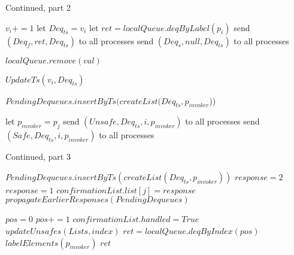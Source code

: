 \documentclass[a4paper,USenglish]{lipics-v2021} %
\begin{document}
\begin{algorithm}
  \caption{Continued, part 2}
  \begin{algorithmic}[1]
      \State $v_i += 1$
      \State let $Deq_{ts} = v_i$
       
        \State let $ret = localQueue.deqByLabel(p_i)$
        \State send $(Deq_f, ret, Deq_{ts})$ to all processes
      \Else
        \State send $(Deq_s, null, Deq_{ts})$ to all processes
      \EndIf
    \EndFunction

       $localQueue.remove(val)$ \EndIf
    \EndFunction

      \State $UpdateTs(v_i, Deq_{ts})$

        \State $PendingDequeues.insertByTs(createList(Deq_{ts}, p_{invoker}$)) 
      \EndIf

      \State let $p_{invoker} = p_j$ 
        \State send $(Unsafe, Deq_{ts}, i, p_{invoker})$ to all processes
      \Else
        \State send $(Safe, Deq_{ts}, i, p_{invoker})$ to all processes
      \EndIf
    \EndFunction
  \end{algorithmic}
\end{algorithm}

\begin{algorithm}
  \caption{Continued, part 3}
  \begin{algorithmic}[1]
        \State $PendingDequeues.insertByTs(createList(Deq_{ts}, p_{invoker}))$
      \EndIf
            \State $response = 2$
          \Else
            \State $response = 1$
          \EndIf
          \State $confirmationList.list[j] = response$
        \EndIf
        \State $propagateEarlierResponses(PendingDequeues)$
      \EndFor

          \State $pos = 0$
              \State $pos += 1$
            \EndIf
          \EndFor
          \State $confirmationList.handled = True$
          \State $updateUnsafes(Lists, index)$
          \State $ret = localQueue.deqByIndex(pos)$
          \State $labelElements(p_{invoker})$
            \State \Return $ret$
          \EndIf
        \EndIf {}  
      \EndFor
    \EndFunction
  \end{algorithmic}
\end{algorithm}
\end{document}
